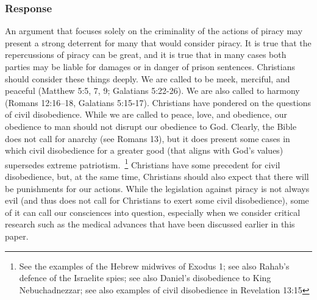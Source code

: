 \documentclass[onecolumn, 12pt]{article}
\begin{document}
\subsubsection{Response}
An argument that focuses solely on the criminality of the actions of piracy
may present a strong deterrent for many that would consider piracy. It is true
that the repercussions of piracy can be great, and it is true that in many
cases both parties may be liable for damages or in danger of prison sentences.
Christians should consider these things deeply. We are called to be meek,
merciful, and peaceful (Matthew 5:5, 7, 9; Galatians 5:22-26). We are also
called to harmony (Romans 12:16--18, Galatians 5:15-17). Christians have
pondered on the questions of civil disobedience. While we are called to peace,
love, and obedience, our obedience to man should not disrupt our obedience to
God. Clearly, the Bible does not call for anarchy (see Romans 13), but it
does present some cases in which civil disobedience for a greater good (that
aligns with God's values) supersedes extreme patriotism.~\footnote{%
  See the examples of the Hebrew midwives of Exodus 1; see also Rahab's defence
  of the Israelite spies; see also Daniel's disobedience to King
  Nebuchadnezzar; see also examples of civil disobedience in Revelation 13:15%
} Christians have some precedent for civil disobedience, but, at the same time,
Christians should also expect that there will be punishments for our actions.
While the legislation against piracy is not always evil (and thus does not
call for Christians to exert some civil disobedience), some of it can call our
consciences into question, especially when we consider critical research such
as the medical advances that have been discussed earlier in this paper.
\end{document}
